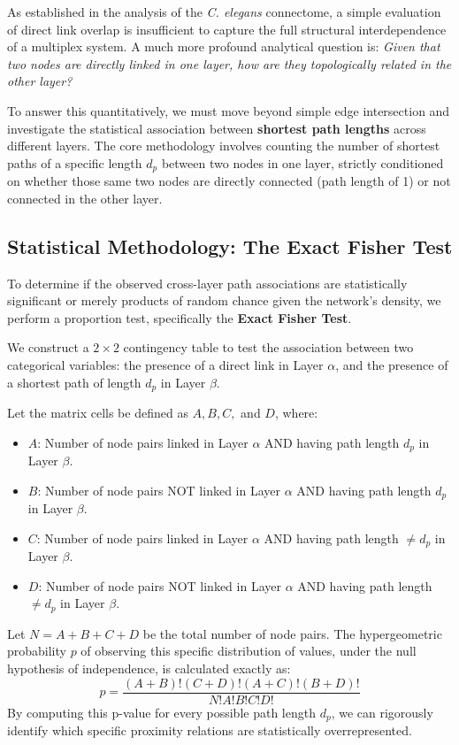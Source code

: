 As established in the analysis of the \textit{C. elegans} connectome, a simple evaluation of direct link overlap is insufficient to capture the full structural interdependence of a multiplex system. A much more profound analytical question is: \textit{Given that two nodes are directly linked in one layer, how are they topologically related in the other layer?}

To answer this quantitatively, we must move beyond simple edge intersection and investigate the statistical association between \textbf{shortest path lengths} across different layers. The core methodology involves counting the number of shortest paths of a specific length \(d_p\) between two nodes in one layer, strictly conditioned on whether those same two nodes are directly connected (path length of 1) or not connected in the other layer.

\subsection{Statistical Methodology: The Exact Fisher Test}
\label{subsec:fisher_exact_test}

To determine if the observed cross-layer path associations are statistically significant or merely products of random chance given the network's density, we perform a proportion test, specifically the \textbf{Exact Fisher Test}.

We construct a \(2 \times 2\) contingency table to test the association between two categorical variables: the presence of a direct link in Layer \(\alpha\), and the presence of a shortest path of length \(d_p\) in Layer \(\beta\).


Let the matrix cells be defined as \(A, B, C,\) and \(D\), where:
\begin{itemize}
    \item \(A\): Number of node pairs linked in Layer \(\alpha\) AND having path length \(d_p\) in Layer \(\beta\).
    \item \(B\): Number of node pairs NOT linked in Layer \(\alpha\) AND having path length \(d_p\) in Layer \(\beta\).
    \item \(C\): Number of node pairs linked in Layer \(\alpha\) AND having path length \(\neq d_p\) in Layer \(\beta\).
    \item \(D\): Number of node pairs NOT linked in Layer \(\alpha\) AND having path length \(\neq d_p\) in Layer \(\beta\).
\end{itemize}
Let \(N = A + B + C + D\) be the total number of node pairs. The hypergeometric probability \(p\) of observing this specific distribution of values, under the null hypothesis of independence, is calculated exactly as:
\[
    p = \frac{(A + B)! (C + D)! (A + C)! (B + D)!}{N! A! B! C! D!}
\]
By computing this p-value for every possible path length \(d_p\), we can rigorously identify which specific proximity relations are statistically overrepresented.


